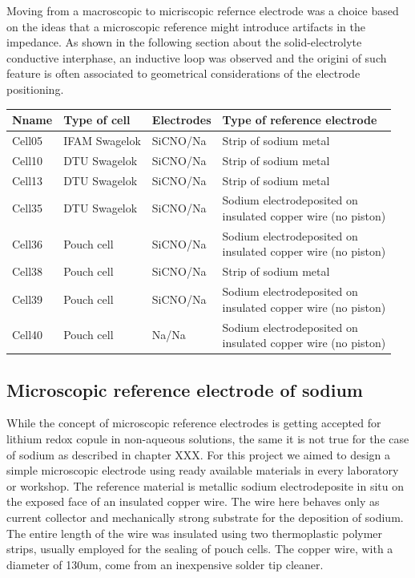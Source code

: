 Moving from a macroscopic to micriscopic refernce electrode was a choice based on the ideas that a microscopic reference might introduce artifacts in the impedance. As shown in the following section about the solid-electrolyte conductive interphase, an inductive loop was observed and the origini of such feature is often associated to geometrical considerations of the electrode positioning.

\begin{table}
\centering

\begin{tabular}{l l l l}
\toprule
\textbf{Nname} & \textbf{Type of cell} & \textbf{Electrodes} & \textbf{Type of reference electrode} \\
\toprule
Cell05 & IFAM Swagelok & SiCNO/Na & Strip of sodium metal \\
Cell10 & DTU Swagelok & SiCNO/Na & Strip of sodium metal \\
Cell13 & DTU Swagelok & SiCNO/Na & Strip of sodium metal \\
Cell35 & DTU Swagelok & SiCNO/Na & \thead[l]{Sodium electrodeposited on \\insulated copper wire (no piston) }\\
Cell36 & Pouch cell & SiCNO/Na & \thead[l]{Sodium electrodeposited on \\insulated copper wire (no piston) } \\
Cell38 & Pouch cell & SiCNO/Na & Strip of sodium metal \\
Cell39 & Pouch cell & SiCNO/Na & \thead[l]{Sodium electrodeposited on \\insulated copper wire (no piston) } \\
Cell40 & Pouch cell & Na/Na & \thead[l]{Sodium electrodeposited on \\insulated copper wire (no piston) } \\
\bottomrule

\end{tabular}

\end{table}


\subsection{Microscopic reference electrode of sodium}

 While the concept of microscopic reference electrodes is getting accepted for lithium redox copule   in non-aqueous solutions, the same it is not true for the case of sodium as described in chapter XXX. For this project we aimed to design a simple microscopic electrode using ready available materials in every laboratory or workshop. The reference material is metallic sodium electrodeposite in situ on the exposed face of an insulated copper wire. The wire here behaves only as current collector and mechanically strong substrate for the deposition of sodium. The entire length of the wire was insulated using two thermoplastic polymer strips, usually employed for the sealing of pouch cells. The copper wire, with a diameter of 130um, come from an inexpensive solder tip cleaner. 

